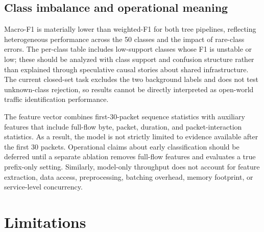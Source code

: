 \documentclass[conference]{IEEEtran}
\begin{document}
\subsection{Class imbalance and operational meaning}

Macro-F1 is materially lower than weighted-F1 for both tree pipelines, reflecting heterogeneous performance across the 50 classes and the impact of rare-class errors. The per-class table includes low-support classes whose F1 is unstable or low; these should be analyzed with class support and confusion structure rather than explained through speculative causal stories about shared infrastructure. The current closed-set task excludes the two background labels and does not test unknown-class rejection, so results cannot be directly interpreted as open-world traffic identification performance.

The feature vector combines first-30-packet sequence statistics with auxiliary features that include full-flow byte, packet, duration, and packet-interaction statistics. As a result, the model is not strictly limited to evidence available after the first 30 packets. Operational claims about early classification should be deferred until a separate ablation removes full-flow features and evaluates a true prefix-only setting. Similarly, model-only throughput does not account for feature extraction, data access, preprocessing, batching overhead, memory footprint, or service-level concurrency.

\section{Limitations}
\label{sec:limitations}
\end{document}
